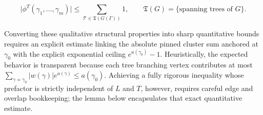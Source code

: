 \documentclass[11pt]{article}
\theoremstyle{definition}
\begin{document}
\[
  \bigl|\phi^T(\gamma_1, \dots, \gamma_m)\bigr| \le \sum_{\mathcal{T} \in \mathfrak{T}(G(\Gamma))} 1, \qquad \mathfrak{T}(G) = \{\text{spanning trees of } G\}.
\]

Converting these qualitative structural properties into sharp quantitative bounds
requires an explicit estimate linking the absolute pinned cluster sum anchored at
$\gamma_0$ with the explicit exponential ceiling $e^{a(\gamma_0)} - 1$.
Heuristically, the expected behavior is transparent because each tree branching
vertex contributes at most $\sum_{\gamma \not\sim \gamma_0} |w(\gamma)|
e^{a(\gamma)} \le a(\gamma_0)$. Achieving a fully rigorous inequality whose
prefactor is strictly independent of $L$ and $T$, however, requires careful edge and
overlap bookkeeping; the lemma below encapsulates that exact quantitative estimate.
\end{document}
